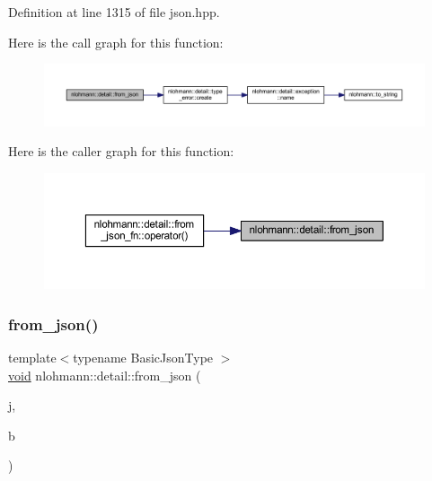 Definition at line 1315 of file json.\+hpp.

Here is the call graph for this function\+:
\nopagebreak
\begin{figure}[H]
\begin{center}
\leavevmode
\includegraphics[width=350pt]{namespacenlohmann_1_1detail_a1f0395aad0fe853a4539288749d3a603_cgraph}
\end{center}
\end{figure}
Here is the caller graph for this function\+:
\nopagebreak
\begin{figure}[H]
\begin{center}
\leavevmode
\includegraphics[width=350pt]{namespacenlohmann_1_1detail_a1f0395aad0fe853a4539288749d3a603_icgraph}
\end{center}
\end{figure}
\mbox{\label{namespacenlohmann_1_1detail_a58117f225f43d03e3a0a4a6f3d77c9d9}} 
\subsubsection{\texorpdfstring{from\_json()}{from\_json()}\hspace{0.1cm}{\footnotesize\ttfamily [2/18]}}
{\footnotesize\ttfamily template$<$typename Basic\+Json\+Type $>$ \\
\mbox{\hyperlink{namespacenlohmann_1_1detail_a59fca69799f6b9e366710cb9043aa77d}{void}} nlohmann\+::detail\+::from\+\_\+json (\begin{DoxyParamCaption}\item[{const Basic\+Json\+Type \&}]{j,  }\item[{typename Basic\+Json\+Type\+::boolean\+\_\+t \&}]{b }\end{DoxyParamCaption})}



